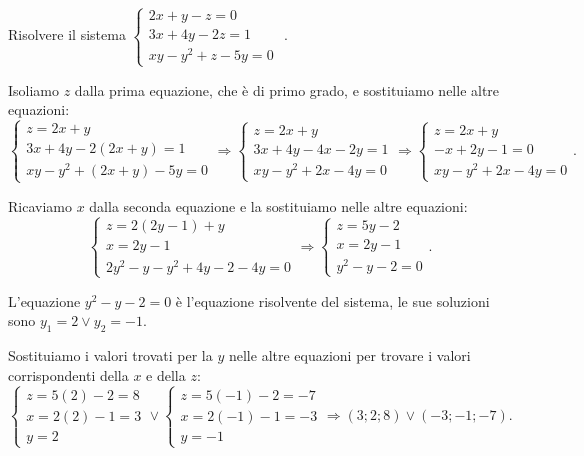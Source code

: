 \begin{esempio}{}{}
Risolvere il sistema 
\(\left\{\begin{array}{l}2x+y-z=0\\3x+4y-2z=1\\xy-y^2+z-5y=0\end{array}\right.\)
.

Isoliamo \( z \) dalla prima equazione, che è di primo grado, e sostituiamo 
nelle altre equazioni: 
\[ \left\{\begin{array}{l}z=2x+y\\
3x+4y-2(2x+y)=1\\
{xy}-y^2+(2x+y)-5y=0\end{array}\right. 
\Rightarrow\left\{\begin{array}{l}z=2x+y\\
3x+4y-4x-2y=1\\
xy-y^2+2x-4y=0\end{array}\right. \Rightarrow\left\{\begin{array}{l}z=2x+y\\
-x+2y-1=0\\
xy-y^2+2x-4y=0\end{array}\right..\]

Ricaviamo \( x \) dalla seconda equazione e la sostituiamo nelle altre 
equazioni: 
\[ \left\{\begin{array}{l}z=2(2y-1)+y\\
x=2y-1\\
2y^2-y-y^2+4y-2-4y=0\end{array}\right. 
\Rightarrow\left\{\begin{array}{l}z=5y-2\\
x=2y-1\\
y^2-y-2=0\end{array}\right..\]

L'equazione \(y^2-y-2=0\) è l'equazione risolvente del sistema, le sue soluzioni 
sono \(y_1=2\vee y_2=-1\).

Sostituiamo i valori trovati per la \( y \) nelle altre equazioni per trovare i 
valori corrispondenti della \( x \) e della \( z \): \[ 
\left\{\begin{array}{l}z=5(2)-2=8 \\x=2(2)-1=3 \\y=2 \end{array}\right.\vee 
\left\{\begin{array}{l}z=5(-1)-2=-7 \\x=2(-1)-1=-3 \\y=-1 
\end{array}\right.\Rightarrow (3;2;8)\vee (-3;-1;-7). \]
\end{esempio}

